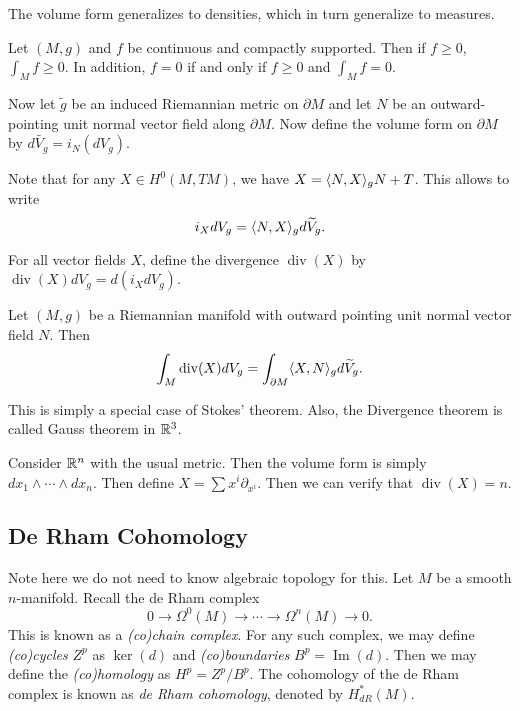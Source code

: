 \documentclass[twoside, 10pt]{article}
\begin{document}
    \begin{rmk}
        The volume form generalizes to densities, which in turn generalize to measures.
    \end{rmk}

    \begin{lem}
        Let $(M,g)$ and $f$ be continuous and compactly supported. Then if $f \geq 0$, $\int_M f \geq 0$. In addition, $f = 0$ if and only if $f \geq 0$ and $\int_M f = 0$.
    \end{lem}

    Now let $\widetilde{g}$ be an induced Riemannian metric on $\partial M$ and let $N$ be an outward-pointing unit normal vector field along $\partial M$. Now define the volume form on $\partial M$ by $d \widetilde{V_g} = i_N(dV_g)$.

    Note that for any $X \in H^0(M,TM)$, we have $X = \langle N,X\rangle_g N + T$.
    This allows to write
    \[ i_X dV_g = \langle N,X\rangle_g d \widetilde{V}_g.\]

    \begin{defn}
        For all vector fields $X$, define the divergence $\operatorname{div}(X)$ by $\operatorname{div}(X) dV_g = d(i_X dV_g)$.
    \end{defn}

    \begin{thm}
        Let $(M,g)$ be a Riemannian manifold with outward pointing unit normal vector field $N$. Then 
        \[ \int_M \operatorname{div}(X) dV_g = \int_{\partial M} \langle X,N\rangle_g d\widetilde{V}_g.\]
    \end{thm}

    This is simply a special case of Stokes' theorem. Also, the Divergence theorem is called Gauss theorem in $\mathbb{R}^3$.

    \begin{exm}
        Consider $\mathbb{R}^n$ with the usual metric. Then the volume form is simply $dx_1 \wedge \cdots \wedge dx_n$. Then define $X = \sum x^i \partial_{x^i}$. Then we can verify that $\operatorname{div}(X) = n$.
    \end{exm}

    \subsection{De Rham Cohomology}%
    \label{sub:de_rham_cohomology}
    
    Note here we do not need to know algebraic topology for this. Let $M$ be a smooth $n$-manifold. Recall the de Rham complex 
    \[ 0 \to \Omega^0(M) \to \cdots \to \Omega^n(M) \to 0.\]
    This is known as a \textit{(co)chain complex}. For any such complex, we may define \textit{(co)cycles} $Z^p$ as $\ker(d)$ and \textit{(co)boundaries} $B^p = \operatorname{Im}(d)$. Then we may define the \textit{(co)homology} as $H^p = Z^p/B^p$. The cohomology of the de Rham complex is known as \textit{de Rham cohomology}, denoted by $H^*_{dR}(M)$.
\end{document}
